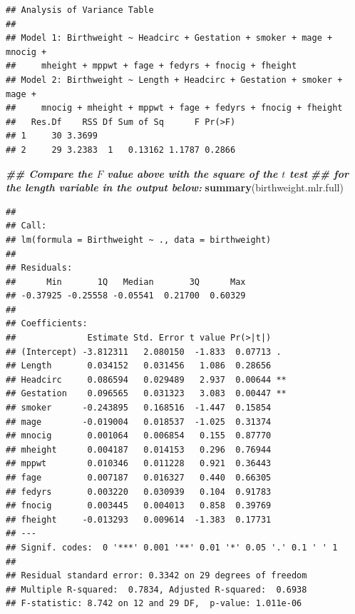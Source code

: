 \documentclass[
]{book}
\newenvironment{Shaded}{\begin{snugshade}}{\end{snugshade}}
\newcommand{\DecValTok}[1]{\textcolor[rgb]{0.00,0.00,0.81}{#1}}
\newcommand{\DocumentationTok}[1]{\textcolor[rgb]{0.56,0.35,0.01}{\textbf{\textit{#1}}}}
\newcommand{\FunctionTok}[1]{\textcolor[rgb]{0.13,0.29,0.53}{\textbf{#1}}}
\newcommand{\NormalTok}[1]{#1}
\newcommand{\SpecialCharTok}[1]{\textcolor[rgb]{0.81,0.36,0.00}{\textbf{#1}}}
\begin{document}
\begin{verbatim}
## Analysis of Variance Table
## 
## Model 1: Birthweight ~ Headcirc + Gestation + smoker + mage + mnocig + 
##     mheight + mppwt + fage + fedyrs + fnocig + fheight
## Model 2: Birthweight ~ Length + Headcirc + Gestation + smoker + mage + 
##     mnocig + mheight + mppwt + fage + fedyrs + fnocig + fheight
##   Res.Df    RSS Df Sum of Sq      F Pr(>F)
## 1     30 3.3699                           
## 2     29 3.2383  1   0.13162 1.1787 0.2866
\end{verbatim}

\begin{Shaded}
\begin{Highlighting}[]
\DocumentationTok{\#\# Compare the $F$ value above with the square of the $t$ test }
\DocumentationTok{\#\# for the length variable in the output below:}
\FunctionTok{summary}\NormalTok{(birthweight.mlr.full)}
\end{Highlighting}
\end{Shaded}

\begin{verbatim}
## 
## Call:
## lm(formula = Birthweight ~ ., data = birthweight)
## 
## Residuals:
##      Min       1Q   Median       3Q      Max 
## -0.37925 -0.25558 -0.05541  0.21700  0.60329 
## 
## Coefficients:
##              Estimate Std. Error t value Pr(>|t|)   
## (Intercept) -3.812311   2.080150  -1.833  0.07713 . 
## Length       0.034152   0.031456   1.086  0.28656   
## Headcirc     0.086594   0.029489   2.937  0.00644 **
## Gestation    0.096565   0.031323   3.083  0.00447 **
## smoker      -0.243895   0.168516  -1.447  0.15854   
## mage        -0.019004   0.018537  -1.025  0.31374   
## mnocig       0.001064   0.006854   0.155  0.87770   
## mheight      0.004187   0.014153   0.296  0.76944   
## mppwt        0.010346   0.011228   0.921  0.36443   
## fage         0.007187   0.016327   0.440  0.66305   
## fedyrs       0.003220   0.030939   0.104  0.91783   
## fnocig       0.003445   0.004013   0.858  0.39769   
## fheight     -0.013293   0.009614  -1.383  0.17731   
## ---
## Signif. codes:  0 '***' 0.001 '**' 0.01 '*' 0.05 '.' 0.1 ' ' 1
## 
## Residual standard error: 0.3342 on 29 degrees of freedom
## Multiple R-squared:  0.7834, Adjusted R-squared:  0.6938 
## F-statistic: 8.742 on 12 and 29 DF,  p-value: 1.011e-06
\end{verbatim}

\begin{Shaded}
\end{Shaded}
\end{document}
